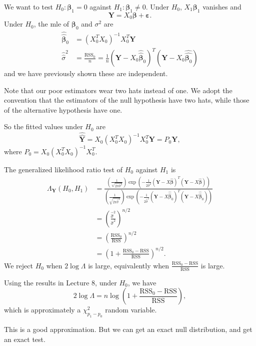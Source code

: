 \documentclass[a4paper]{article}
\begin{document}
We want to test $H_0: \boldsymbol\beta_1 = 0$ against $H_1: \boldsymbol\beta_1 \not= 0$. Under $H_0$, $X_1 \boldsymbol\beta_1$ vanishes and
\[
  \mathbf{Y} = X_0 \boldsymbol\beta + \boldsymbol\varepsilon.
\]
Under $H_0$, the mle of $\boldsymbol\beta_0$ and $\sigma^2$ are
\begin{align*}
  \hat{\hat{\boldsymbol\beta}}_0 &= (X_0^TX_0)^{-1}X_0^T \mathbf{Y}\\
  \hat{\hat{\sigma}}^2 &= \frac{\mathrm{RSS}_0}{n} = \frac{1}{n} (\mathbf{Y} - X_0 \hat{\hat{\boldsymbol\beta}}_0)^T(\mathbf{Y} - X_0 \hat{\hat{\boldsymbol\beta_0}})
\end{align*}
and we have previously shown these are independent.

Note that our poor estimators wear two hats instead of one. We adopt the convention that the estimators of the null hypothesis have two hats, while those of the alternative hypothesis have one.

So the fitted values under $H_0$ are
\[
  \hat{\hat{\mathbf{Y}}} = X_0(X_0^TX_0)^{-1}X_0^T \mathbf{Y} = P_0 \mathbf{Y},
\]
where $P_0 = X_0(X_0^T X_0)^{-1}X_0^T$.

The generalized likelihood ratio test of $H_0$ against $H_1$ is
\begin{align*}
  \Lambda_\mathbf{Y}(H_0, H_1) &= \frac{\left(\frac{1}{\sqrt{2\pi \hat{\sigma}^2}}\right)\exp\left(-\frac{1}{2\hat{\sigma}^2}(\mathbf{Y} - X\hat{\boldsymbol\beta})^T(\mathbf{Y} - X\hat{\boldsymbol\beta})\right)}{\left(\frac{1}{\sqrt{2\pi \hat{\hat{\sigma}}^2}}\right)\exp\left(-\frac{1}{2\hat{\hat{\sigma}}^2}(\mathbf{Y} - X\hat{\hat{\boldsymbol\beta}}_0)^T(\mathbf{Y} - X\hat{\hat{\boldsymbol\beta}}_0)\right)}\\
  &= \left(\frac{\hat{\hat{\sigma}}^2}{\hat{\sigma}^2}\right)^{n/2} \\
  &= \left(\frac{\text{RSS}_0}{\mathrm{RSS}}\right)^{n/2} \\
  &= \left(1 + \frac{\mathrm{RSS}_0 - \mathrm{RSS}}{\mathrm{RSS}}\right)^{n/2}.
\end{align*}
We reject $H_0$ when $2\log \Lambda$ is large, equivalently when $\frac{\mathrm{RSS}_0 - \mathrm{RSS}}{\mathrm{RSS}}$ is large.

Using the results in Lecture 8, under $H_0$, we have
\[
  2\log \Lambda = n\log\left(1 + \frac{\mathrm{RSS}_0 - \mathrm{RSS}}{\mathrm{RSS}}\right),
\]
which is approximately a $\chi_{p_1 - p_0}^2$ random variable.

This is a good approximation. But we can get an exact null distribution, and get an exact test.
\end{document}
